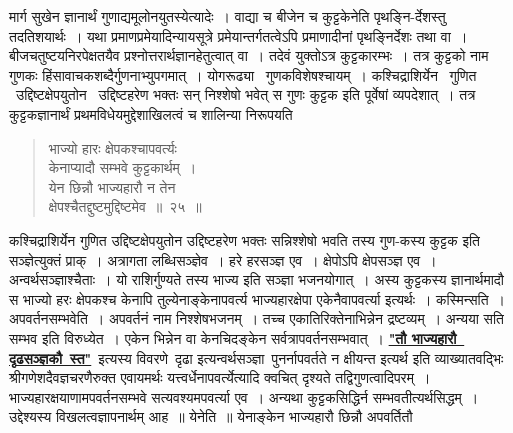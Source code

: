 \documentclass[11pt, openany]{book}
\begin{document}
\noindent मार्ग सुखेन ज्ञानार्थं गुणाद्यमूलोनयुतस्येत्यादेः~। वाद्या च बीजेन 
च कुट्टकेनेति पृथङ्नि-र्देशस्तु तदतिशयार्थः~। यथा
प्रमाणप्रमेयादिन्यायसूत्रे प्रमेयान्तर्गतत्वेऽपि प्रमाणादीनां पृथङ्निर्देशः तथा वा~।
बीजचतुष्टयनिरपेक्षतयैव प्रश्नोत्तरार्थज्ञानहेतुत्वात् वा~। तदेवं युक्तोऽत्र कुट्टकारम्भः~। तत्र कुट्टको नाम गुणकः हिंसावाचकशब्दैर्गुणनाभ्युपगमात्~। योगरूढ्या ~गुणकविशेषश्चायम्~। कश्चिद्राशिर्येन ~गुणित ~उद्दिष्टक्षेपयुतोन ~उद्दिष्टहरेण भक्तः सन्
निश्शेषो भवेत् स गुणः कुट्टक इति पूर्वेषां व्यपदेशात्~। तत्र कुट्टकज्ञानार्थं
प्रथमविधेयमुद्देशाखिलत्वं च शालिन्या निरूपयति\textendash 

 \label{25}
\begin{quote}
    \bs
    
 भाज्यो हारः क्षेपकश्चापवर्त्यः \\

\vspace{-7mm}
\hspace{1cm} केनाप्यादौ सम्भवे कुट्टकार्थम्~। \\

\vspace{-7mm}
 येन छिन्नौ भाज्यहारौ न तेन \\

\vspace{-7mm}
\hspace{1cm} क्षेपश्चैतद्दुष्टमुद्दिष्टमेव~॥~२५~॥ 

\end{quote}

 कश्चिद्राशिर्येन गुणित उद्दिष्टक्षेपयुतोन उद्दिष्टहरेण भक्तः
सन्निश्शेषो भवति तस्य गुण-कस्य कुट्टक इति सञ्ज्ञेत्युक्तं प्राक्~। अत्रागता 
लब्धिसञ्ज्ञेव~। हरे हरसञ्ज्ञ एव~। क्षेपोऽपि क्षेपसञ्ज्ञ एव~।
अन्वर्थसञ्ज्ञाश्चैताः~। यो राशिर्गुण्यते तस्य भाज्य इति सञ्ज्ञा भजनयोगात्~। अस्य कुट्टकस्य ज्ञानार्थमादौ स भाज्यो हरः क्षेपकश्च केनापि तुल्येनाङ्केनापवर्त्य भाज्यहारक्षेपा एकेनैवापवर्त्या इत्यर्थः~। कस्मिन्सति~। अपवर्तनसम्भवेति~।
अपवर्तनं नाम निश्शेषभजनम्~। तच्च एकातिरिक्तेनाभिन्नेन द्रष्टव्यम्~। अन्यया सति 
सम्भव इति विरुध्येत~। एकेन भिन्नेन वा केनचिदङ्केन सर्वत्रापवर्तनसम्भवात्~।
\hyperref[26]{\textbf{"तौ भाज्यहारौ \,दृढसञ्ज्ञकौ \,स्त"}} \,इत्यस्य विवरणे \,दृढा इत्यन्वर्थसञ्ज्ञा \,पुनर्नापवर्तते न क्षीयन्त इत्यर्थ इति व्याख्यातवद्भिः श्रीगणेशदैवज्ञचरणैरुक्त एवायमर्थः यत्त्वर्धेनापवर्त्येत्यादि क्वचित् दृश्यते तद्विगुणत्वादिपरम्~। भाज्यहारक्षयाणामपवर्तनसम्भवे सत्यवश्यमपवर्त्या एव~। अन्यथा कुट्टकसिद्धिर्न सम्भवतीत्यर्थसिद्धम्~। उद्देश्यस्य विखलत्वज्ञापनार्थम् आह~॥ येनेति~॥ येनाङ्केन भाज्यहारौ छिन्नौ अपवर्तितौ
\end{document}

